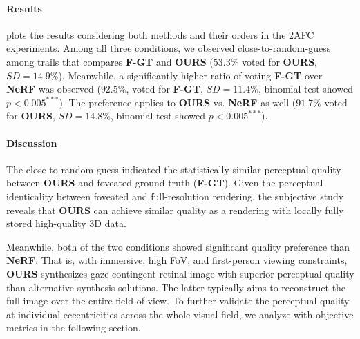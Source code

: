 \paragraph{Results}

 plots the results considering both methods and their orders in the 2AFC experiments. Among all three conditions, we observed close-to-random-guess among trails that compares {\bf F-GT} and {\bf OURS} ($53.3\%$ voted for {\bf OURS}, $SD=14.9\%$). Meanwhile, a significantly higher ratio of voting {\bf F-GT} over {\bf NeRF} was observed ($92.5\%$, voted for {\bf F-GT}, $SD=11.4\%$, binomial test showed $p<0.005^{***}$). The preference applies to {\bf OURS} vs. {\bf NeRF} as well ($91.7\%$ voted for {\bf OURS}, $SD=14.8\%$, binomial test showed $p<0.005^{***}$).


\paragraph{Discussion}
The close-to-random-guess indicated the statistically similar perceptual quality between {\bf OURS} and foveated ground truth ({\bf F-GT}). 
Given the perceptual identicality between foveated and full-resolution rendering, the subjective study reveals that {\bf OURS} can achieve similar quality as a rendering with locally fully stored high-quality 3D data.

Meanwhile, both of the two conditions showed significant quality preference than {\bf NeRF}. That is, with immersive, high FoV, and first-person viewing constraints, {\bf OURS} synthesizes gaze-contingent retinal image with superior perceptual quality than alternative synthesis solutions. The latter typically aims to reconstruct the full image over the entire field-of-view. 
To further validate the perceptual quality at individual eccentricities across the whole visual field, we analyze with objective metrics in the following section.

